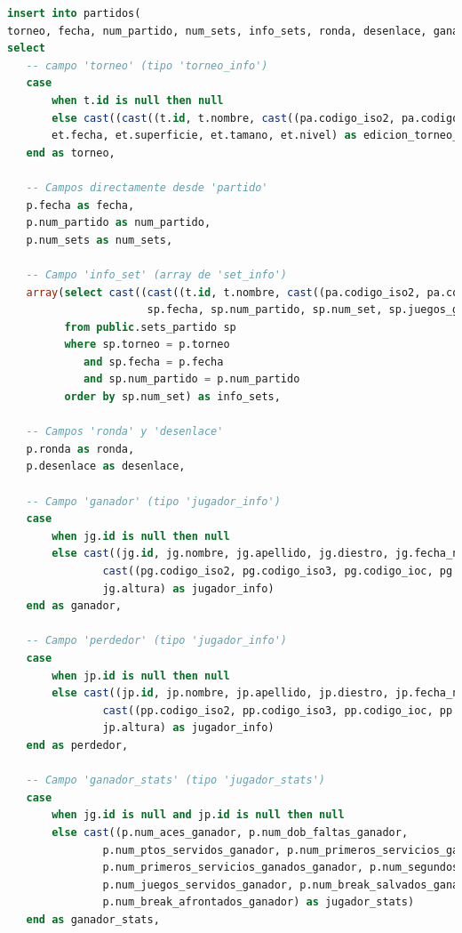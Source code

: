 \documentclass[10pt]{opticajnl}
\begin{document}
\begin{lstlisting}[language=SQL]
insert into partidos(
torneo, fecha, num_partido, num_sets, info_sets, ronda, desenlace, ganador, perdedor, ganador_stats, perdedor_stats)
select
   -- campo 'torneo' (tipo 'torneo_info')
   case
       when t.id is null then null
       else cast((cast((t.id, t.nombre, cast((pa.codigo_iso2, pa.codigo_iso3, pa.codigo_ioc, pa.nombre) as pais_info)) as torneo_info), 
       et.fecha, et.superficie, et.tamano, et.nivel) as edicion_torneo_info)
   end as torneo,
  
   -- Campos directamente desde 'partido'
   p.fecha as fecha,
   p.num_partido as num_partido,
   p.num_sets as num_sets,
  
   -- Campo 'info_set' (array de 'set_info')
   array(select cast((cast((t.id, t.nombre, cast((pa.codigo_iso2, pa.codigo_iso3, pa.codigo_ioc, pa.nombre) as pais_info)) as torneo_info),
                      sp.fecha, sp.num_partido, sp.num_set, sp.juegos_ganador, sp.juegos_perdedor, sp.puntos_tiebreak_perdedor) as set_info)
         from public.sets_partido sp
         where sp.torneo = p.torneo
         	and sp.fecha = p.fecha
         	and sp.num_partido = p.num_partido
         order by sp.num_set) as info_sets,
  
   -- Campos 'ronda' y 'desenlace'
   p.ronda as ronda,
   p.desenlace as desenlace,
  
   -- Campo 'ganador' (tipo 'jugador_info')
   case
       when jg.id is null then null
       else cast((jg.id, jg.nombre, jg.apellido, jg.diestro, jg.fecha_nacimiento,
       		   cast((pg.codigo_iso2, pg.codigo_iso3, pg.codigo_ioc, pg.nombre) as pais_info),
       		   jg.altura) as jugador_info)
   end as ganador,
  
   -- Campo 'perdedor' (tipo 'jugador_info')
   case
       when jp.id is null then null
       else cast((jp.id, jp.nombre, jp.apellido, jp.diestro, jp.fecha_nacimiento,
       		   cast((pp.codigo_iso2, pp.codigo_iso3, pp.codigo_ioc, pp.nombre) as pais_info),
       		   jp.altura) as jugador_info)
   end as perdedor,
  
   -- Campo 'ganador_stats' (tipo 'jugador_stats')
   case
       when jg.id is null and jp.id is null then null
       else cast((p.num_aces_ganador, p.num_dob_faltas_ganador,
           	   p.num_ptos_servidos_ganador, p.num_primeros_servicios_ganador,
           	   p.num_primeros_servicios_ganados_ganador, p.num_segundos_servicios_ganados_ganador,
           	   p.num_juegos_servidos_ganador, p.num_break_salvados_ganador,
           	   p.num_break_afrontados_ganador) as jugador_stats)
   end as ganador_stats,
  

\end{lstlisting}
\end{document}
